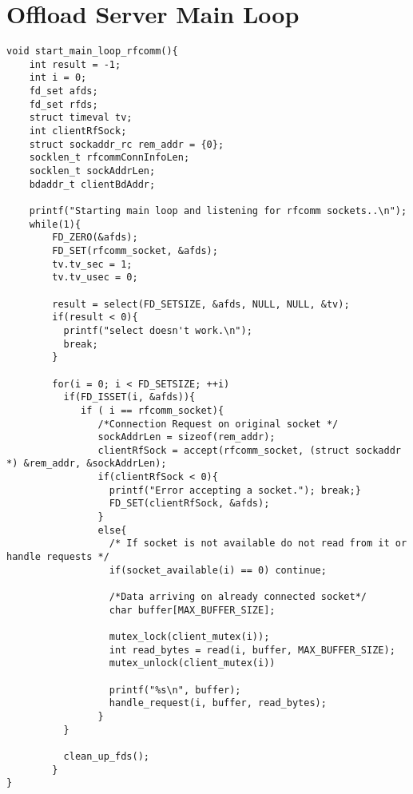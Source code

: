 \chapter{Offload Server Main Loop}
\label{appendix:servermainloop}


\lstset{language=c,caption=Main Loop of BLEOffloadingFramework server, label=lst:servermainloop}
\begin{lstlisting}
void start_main_loop_rfcomm(){
    int result = -1;
    int i = 0;
    fd_set afds;
    fd_set rfds;
    struct timeval tv;
    int clientRfSock;
    struct sockaddr_rc rem_addr = {0};
    socklen_t rfcommConnInfoLen;
    socklen_t sockAddrLen;
    bdaddr_t clientBdAddr;

    printf("Starting main loop and listening for rfcomm sockets..\n");
    while(1){
        FD_ZERO(&afds);
        FD_SET(rfcomm_socket, &afds);
        tv.tv_sec = 1;
        tv.tv_usec = 0;

        result = select(FD_SETSIZE, &afds, NULL, NULL, &tv);
        if(result < 0){
          printf("select doesn't work.\n");
          break;
        }

        for(i = 0; i < FD_SETSIZE; ++i)
          if(FD_ISSET(i, &afds)){
             if ( i == rfcomm_socket){
                /*Connection Request on original socket */
                sockAddrLen = sizeof(rem_addr);
                clientRfSock = accept(rfcomm_socket, (struct sockaddr *) &rem_addr, &sockAddrLen);
                if(clientRfSock < 0){
                  printf("Error accepting a socket."); break;}
                  FD_SET(clientRfSock, &afds);
                }
                else{
                  /* If socket is not available do not read from it or handle requests */
                  if(socket_available(i) == 0) continue;
                  
                  /*Data arriving on already connected socket*/
                  char buffer[MAX_BUFFER_SIZE];
                  
                  mutex_lock(client_mutex(i));
                  int read_bytes = read(i, buffer, MAX_BUFFER_SIZE);
                  mutex_unlock(client_mutex(i))
                  
                  printf("%s\n", buffer);
                  handle_request(i, buffer, read_bytes);
                }
          }
          
          clean_up_fds();
        }
}
\end{lstlisting}
